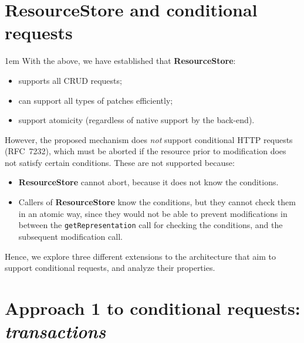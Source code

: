 \documentclass[10pt]{article}
\newenvironment{Note}
  {\begin{multicols}{3}%
     \parskip 1em}
  {\end{multicols}}
\begin{document}
\section*{ResourceStore and conditional requests}
\begin{Note}
With the above,
we have established that \textbf{ResourceStore}:
\begin{itemize}
  \item supports all CRUD requests;
  \item can support all types of patches efficiently;
  \item support atomicity
        (regardless of native support by the back-end).
\end{itemize}

\columnbreak
However, the proposed mechanism
does \emph{not} support conditional HTTP requests (RFC~7232),
which must be aborted if the resource
prior to modification
does not satisfy certain conditions.
These are not supported because:
\begin{itemize}
  \item \textbf{ResourceStore} cannot abort,
        because it does not know the conditions.
  \item Callers of \textbf{ResourceStore} know the conditions,
        but they cannot check them in an atomic way,
        since they would not be able to prevent modifications
        in between the \verb!getRepresentation! call for checking the conditions,
        and the subsequent modification call.
\end{itemize}

\columnbreak
Hence,
we explore three different extensions to the architecture
that aim to support conditional requests,
and analyze their properties.

\end{Note}

\clearpage

\section*{Approach 1 to conditional requests: \emph{transactions}}
\end{document}
